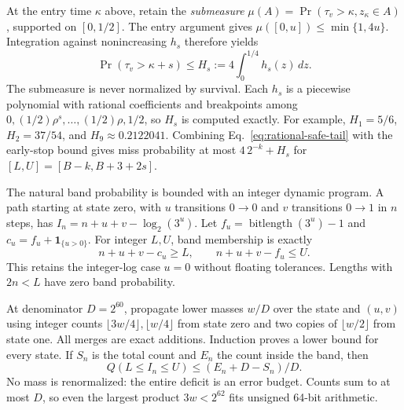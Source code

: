 At the entry time $\kappa$ above, retain the \emph{submeasure}
$\mu(A)=\Pr(\tau_v>\kappa,z_\kappa\in A)$, supported on $[0,1/2]$.
The entry argument gives $\mu([0,u])\le\min\{1,4u\}$. Integration against
nonincreasing $h_s$ therefore yields
\begin{equation}
 \Pr(\tau_v>\kappa+s)\le H_s:=4\int_0^{1/4}h_s(z)\,dz.
 \label{eq:rational-safe-tail}
\end{equation}
The submeasure is never normalized by survival. Each $h_s$ is a piecewise
polynomial with rational coefficients and breakpoints among
$0,(1/2)\rho^s,\ldots,(1/2)\rho,1/2$, so $H_s$ is computed exactly.
For example, $H_1=5/6$, $H_2=37/54$, and $H_9\approx0.2122041$.
Combining Eq.~\eqref{eq:rational-safe-tail} with the early-stop bound gives
miss probability at most $4\,2^{-k}+H_s$ for $[L,U]=[B-k,B+3+2s]$.

The natural band probability is bounded with an integer dynamic program.
A path starting at state zero, with $u$ transitions $0\to0$ and $v$ transitions
$0\to1$ in $n$ steps, has
$I_n=n+u+v-\log_2(3^u)$. Let
$f_u=\operatorname{bitlength}(3^u)-1$ and $c_u=f_u+\mathbf1_{\{u>0\}}$.
For integer $L,U$, band membership is exactly
\[
 n+u+v-c_u\ge L,\qquad n+u+v-f_u\le U.
\]
This retains the integer-log case $u=0$ without floating tolerances.
Lengths with $2n<L$ have zero band probability.

At denominator $D=2^{60}$, propagate lower masses $w/D$ over the state and
$(u,v)$ using integer counts $\lfloor3w/4\rfloor,\lfloor w/4\rfloor$
from state zero and two copies of $\lfloor w/2\rfloor$ from state one.
All merges are exact additions. Induction proves a lower bound for every
state. If $S_n$ is the total count and $E_n$ the count inside the band, then
\[
 Q(L\le I_n\le U)\le(E_n+D-S_n)/D.
\]
No mass is renormalized: the entire deficit is an error budget. Counts sum
to at most $D$, so even the largest product $3w<2^{62}$ fits unsigned 64-bit
arithmetic.

